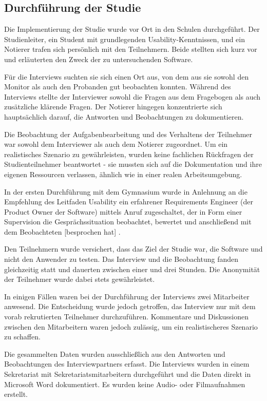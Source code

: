 \subsection{Durchführung der Studie}

Die Implementierung der Studie wurde vor Ort in den Schulen durchgeführt. Der Studienleiter, ein Student mit grundlegenden Usability-Kenntnissen, und ein Notierer trafen sich persönlich mit den Teilnehmern. Beide stellten sich kurz vor und erläuterten den Zweck der zu untersuchenden Software.

Für die Interviews suchten sie sich einen Ort aus, von dem aus sie sowohl den Monitor als auch den Probanden gut beobachten konnten. Während des Interviews stellte der Interviewer sowohl die Fragen aus dem Fragebogen als auch zusätzliche klärende Fragen. Der Notierer hingegen konzentrierte sich hauptsächlich darauf, die Antworten und Beobachtungen zu dokumentieren.

Die Beobachtung der Aufgabenbearbeitung und des Verhaltens der Teilnehmer war sowohl dem Interviewer als auch dem Notierer zugeordnet. Um ein realistisches Szenario zu gewährleisten, wurden keine fachlichen Rückfragen der Studienteilnehmer beantwortet - sie mussten sich auf die Dokumentation und ihre eigenen Ressourcen verlassen, ähnlich wie in einer realen Arbeitsumgebung.

In der ersten Durchführung mit dem Gymnasium wurde in Anlehnung an die Empfehlung des Leitfaden Usability ein erfahrener Requirements Engineer (der Product Owner der Software) mittels Anruf zugeschaltet, der \glqq in Form einer Supervision die Gesprächssituation beobachtet, bewertet und anschließend mit dem Beobachteten [besprochen hat]\grqq{} \cite[p.~133]{dakks}.

Den Teilnehmern wurde versichert, dass das Ziel der Studie war, die Software und nicht den Anwender zu testen. Das Interview und die Beobachtung fanden gleichzeitig statt und dauerten zwischen einer und drei Stunden. Die Anonymität der Teilnehmer wurde dabei stets gewährleistet.

In einigen Fällen waren bei der Durchführung der Interviews zwei Mitarbeiter anwesend. Die Entscheidung wurde jedoch getroffen, das Interview nur mit dem vorab rekrutierten Teilnehmer durchzuführen. Kommentare und Diskussionen zwischen den Mitarbeitern waren jedoch zulässig, um ein realistischeres Szenario zu schaffen.

Die gesammelten Daten wurden ausschließlich aus den Antworten und Beobachtungen des Interviewpartners erfasst. Die Interviews wurden in einem Sekretariat mit Sekretariatsmitarbeitern durchgeführt und die Daten direkt in Microsoft Word dokumentiert. Es wurden keine Audio- oder Filmaufnahmen erstellt.

